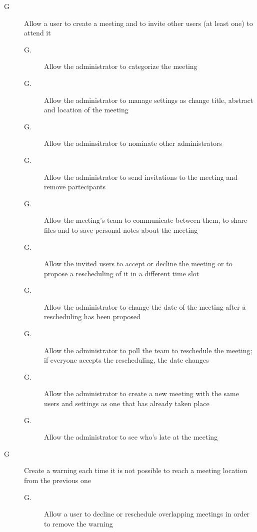 \begin{description}
\item[G\thecount] Allow a user to create a meeting and to invite other users (at least one) to attend it
\begin{description}
\item[G\thecount.\thecountin] Allow the administrator to categorize the meeting
\item[G\thecount.\thecountin] Allow the administrator to manage settings as change title, abstract and location of the meeting
\item[G\thecount.\thecountin] Allow the adminsitrator to nominate other administrators
\item[G\thecount.\thecountin] Allow the administrator to send invitations to the meeting and remove partecipants
\item[G\thecount.\thecountin] Allow the meeting’s team to communicate between them, to share files and to save personal notes about the meeting
\item[G\thecount.\thecountin] Allow the invited users to accept or decline the meeting or to propose a rescheduling of it in a different time slot
\item[G\thecount.\thecountin] Allow the administrator to change the date of the meeting after a rescheduling has been proposed
\item[G\thecount.\thecountin] Allow the administrator to poll the team to reschedule the meeting; if everyone accepts the rescheduling, the date changes
\item[G\thecount.\thecountin] Allow the administrator to create a new meeting with the same users and settings as one that has already taken place
\item[G\thecount.\thecountin] Allow the administrator to see who’s late at the meeting
\end{description}

\setcounter{countin}{1}

\item[G\thecount] Create a warning each time it is not possible to reach a meeting location from the previous one
\begin{description}
\item[G\thecount.\thecountin] Allow a user to decline or reschedule overlapping meetings in order to remove the warning
\end{description}


\end{description}
